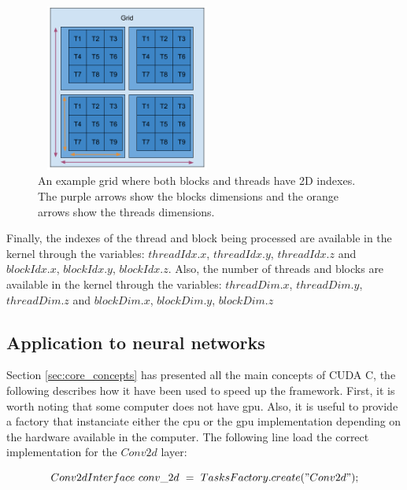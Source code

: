 \documentclass[11pt]{report}
\begin{document}
\begin{figure}[h]
\centering
\includegraphics[width=6cm, height=5.5cm]{grid}
\caption{An example grid where both blocks and threads have 2D indexes. The purple arrows show the blocks dimensions and the orange arrows show the threads dimensions.}
\label{fig:grid}
\end{figure}

\noindent Finally, the indexes of the thread and block being processed are available in the kernel through the variables: $threadIdx.x$, $threadIdx.y$, $threadIdx.z$ and  $blockIdx.x$, $blockIdx.y$, $blockIdx.z$. Also, the number of threads and blocks are available in the kernel through the variables: $threadDim.x$, $threadDim.y$, $threadDim.z$ and  $blockDim.x$, $blockDim.y$, $blockDim.z$

\subsection{Application to neural networks}

Section \ref{sec:core_concepts} has presented all the main concepts of CUDA C, the following describes how it have been used to speed up the framework. First, it is worth noting that some computer does not have \acrshort{gpu}. Also, it is useful to provide a factory that instanciate either the \acrshort{cpu} or the \acrshort{gpu} implementation depending on the hardware available in the computer. The following line load the correct implementation for the $Conv2d$ layer:

$$Conv2dInterface\ conv\_2d\ =\ TasksFactory.create("Conv2d");$$
\end{document}
